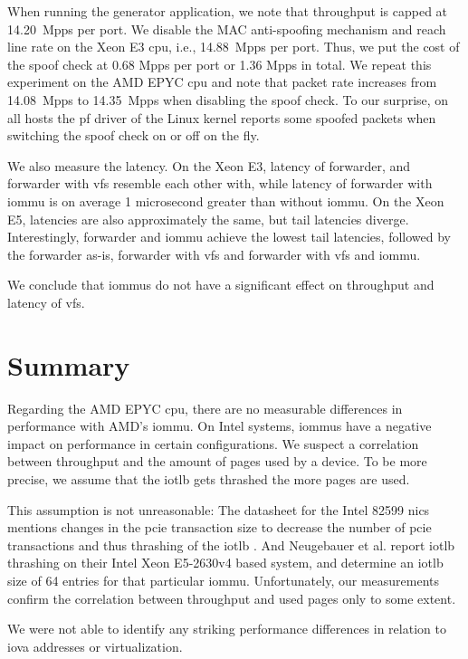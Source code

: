 When running the generator application, we note that throughput is capped at
14.20~Mpps per port. We disable the MAC anti-spoofing mechanism and reach line
rate on the Xeon E3 \ac{cpu}, i.e., 14.88~Mpps per port. Thus, we put the cost
of the spoof check at 0.68 Mpps per port or 1.36 Mpps in total. We repeat this
experiment on the AMD EPYC \ac{cpu} and note that packet rate increases from
14.08~Mpps to 14.35~Mpps when disabling the spoof check. To our surprise, on all
hosts the \ac{pf} driver of the Linux kernel reports some spoofed packets when
switching the spoof check on or off on the fly.

We also measure the latency. On the Xeon E3, latency of forwarder, and forwarder
with \acp{vf} resemble each other with, while latency of forwarder with
\ac{iommu} is on average 1 microsecond greater than without \ac{iommu}. On the
Xeon E5, latencies are also approximately the same, but tail latencies diverge.
Interestingly, forwarder and \ac{iommu} achieve the lowest tail latencies,
followed by the forwarder as-is, forwarder with \acp{vf} and forwarder with
\acp{vf} and \ac{iommu}.

We conclude that \acp{iommu} do not have a significant effect on throughput and
latency of \acp{vf}.


\section{Summary}
\label{sec:perf_summary}

Regarding the AMD EPYC \ac{cpu}, there are no measurable differences in
performance with AMD's \ac{iommu}. On Intel systems, \acp{iommu} have a negative
impact on performance in certain configurations. We suspect a correlation
between throughput and the amount of pages used by a device. To be more precise,
we assume that the \ac{iotlb} gets thrashed the more pages are used.

This assumption is not unreasonable: The datasheet for the Intel 82599 \acp{nic}
mentions changes in the \ac{pcie} transaction size to decrease the number of
\ac{pcie} transactions and thus thrashing of the \ac{iotlb}
\cite[p.~34]{intel2019datasheet}. And Neugebauer et al.
\cite{neugebauer2018understanding} report \ac{iotlb} thrashing on their Intel
Xeon E5-2630v4 based system, and determine an \ac{iotlb} size of 64 entries for
that particular \ac{iommu}. Unfortunately, our measurements confirm the
correlation between throughput and used pages only to some extent.

We were not able to identify any striking performance differences in relation to
\ac{iova} addresses or virtualization.

